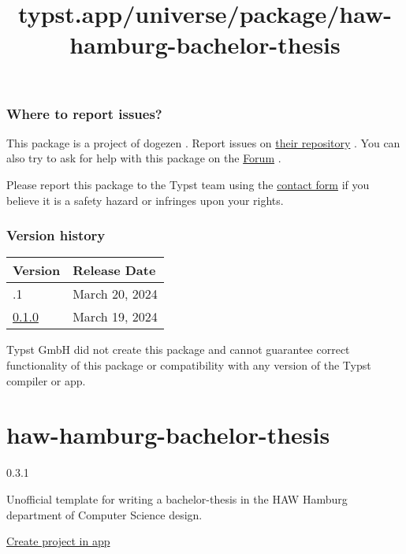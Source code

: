 \subsubsection{Where to report issues?}\label{where-to-report-issues}

This package is a project of dogezen . Report issues on
\href{https://github.com/dogezen/badgery}{their repository} . You can
also try to ask for help with this package on the
\href{https://forum.typst.app}{Forum} .

Please report this package to the Typst team using the
\href{https://typst.app/contact}{contact form} if you believe it is a
safety hazard or infringes upon your rights.

\label{versions}
\subsubsection{Version history}\label{version-history}

\begin{longtable}[]{@{}ll@{}}
\toprule\noalign{}
Version & Release Date \\
\midrule\noalign{}
\endhead
\bottomrule\noalign{}
\endlastfoot
0.1.1 & March 20, 2024 \\
\href{https://typst.app/universe/package/badgery/0.1.0/}{0.1.0} & March
19, 2024 \\
\end{longtable}

Typst GmbH did not create this package and cannot guarantee correct
functionality of this package or compatibility with any version of the
Typst compiler or app.


\title{typst.app/universe/package/haw-hamburg-bachelor-thesis}

\label{banner}
\label{template-thumbnail}

\section{haw-hamburg-bachelor-thesis}\label{haw-hamburg-bachelor-thesis}

{ 0.3.1 }

Unofficial template for writing a bachelor-thesis in the HAW Hamburg
department of Computer Science design.

\href{/app?template=haw-hamburg-bachelor-thesis&version=0.3.1}{Create
project in app}

